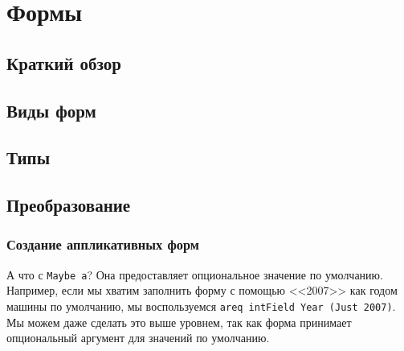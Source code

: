 \chapter{Формы}


\section{Краткий обзор}


\section{Виды форм}

\section{Типы}

\section{Преобразование}

\subsection{Создание аппликативных форм}

А что с \lstinline'Maybe a'? Она предоставляет опциональное значение по умолчанию. 
Например, если мы хватим заполнить форму с помощью <<2007>> как годом машины по
умолчанию, мы воспользуемся \lstinline!аreq intField Year (Just 2007)!. Мы можем даже
сделать это выше уровнем, так как форма принимает опциональный аргумент для значений по
умолчанию.

